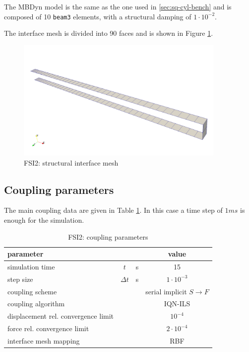 The MBDyn model is the same as the one used in \ref{sec:sq-cyl-bench} and is composed of 10 \texttt{beam3} elements, with a structural damping of $1\cdot10^{-2}$.

The interface mesh is divided into 90 faces and is shown in Figure \ref{fig:FSI2_struct_mesh}. 

\begin{figure}[htbp!]
	\centering
	\includegraphics[width=0.9\textwidth, trim=0 50 0 150, clip]{images/FSI2/fsi2_struct_mesh.png}
	\caption{FSI2: structural interface mesh}
	\label{fig:FSI2_struct_mesh}
\end{figure}


\subsection{Coupling parameters}


The main coupling data are given in Table \ref{table:FSI2-coupling}. In this case a time step of $1ms$ is enough for the simulation.

\begin{table}[!htb]
	\begin{center}
		\begin{tabular}{ l c  l| c } 
			parameter & & & value   \\ 
			\hline
			simulation time  & $t$& \si{s} & 15      \\
			step size & $\Delta t$ & \si{s} & $1 \cdot 10^{-3}$   \\
			\hline
			coupling scheme & & & serial implicit  $S\rightarrow F$  \\
			coupling algorithm & & &  IQN-ILS  \\
			displacement rel. convergence limit & & & $10^{-4}$ \\
			force rel. convergence limit &&  & $2 \cdot 10^{-4}$  \\
      		interface mesh mapping & & & RBF  \\
			
		\end{tabular}
	\end{center}
	\caption{FSI2: coupling parameters}
	\label{table:FSI2-coupling}
\end{table}


